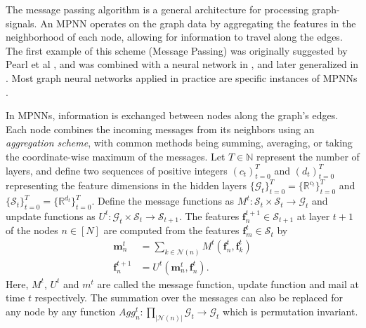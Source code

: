 \documentclass[letterpaper]{article} %
\newcommand{\ron}[1]{{{\textcolor{red}{\textbf{[Ron:} {#1}\textbf{]}}}}}
\begin{document}

The message passing algorithm is a general architecture for processing graph-signals. An MPNN operates on the graph data by aggregating the features in the neighborhood of each node, allowing for information to travel along the edges. The first example of this scheme (Message Passing) was originally suggested by Pearl et al \cite{pearl1982belief},  and was combined with a neural network in \cite{duvenaud2015convolutional}, and later generalized in \cite{gilmer2017neural}. Most graph neural networks applied in practice are specific instances of MPNNs \cite{MPNN,GCN,GAT}. %

In MPNNs, information is exchanged between nodes along the graph's edges. Each node combines the incoming messages from its neighbors using an \emph{aggregation scheme}, with common methods being summing, averaging, or taking the coordinate-wise maximum of the messages.
Let $T \in \mathbb{N}$ represent the number of layers, and define two sequences of positive integers $(c_t)_{t=0}^T$ and $(d_t)_{t=0}^T$ representing the feature dimensions in the hidden layers $\{\mathcal{G}_t\}_{t=0}^T = \{\mathbb{R}^{c_t}\}_{t=0}^T$ and  $\{\mathcal{S}_t\}_{t=0}^T = \{\mathbb{R}^{d_t}\}_{t=0}^T$. Define the message functions as  $M^t : \mathcal{S}_t \times \mathcal{S}_t \rightarrow \mathcal{G}_t$  and unpdate functions as $U^t: \mathcal{G}_t \times \mathcal{S}_t \rightarrow \mathcal{S}_{t+1}$.
The features $\mathbf{f}_n^{t+1} \in \mathcal{S}_{t+1}$ at layer $t+1$ of the nodes $n\in[N]$ are computed from the features $\mathbf{f}_m^t  \in \mathcal{S}_t$ by 
\begin{align*}
    \mathbf{m}^{t}_n &= \underset{k\in \mathcal{N}(n)}{\sum}{M^t(\mathbf{f}^t_n,\mathbf{f}^t_k)}\\
    \mathbf{f}^{t+1}_n &= U^t(\mathbf{m}^t_n, \mathbf{f}^t_n).
\end{align*}
Here, $M^t$, $U^t$ and $m^t$ are called the message function, update function and mail at time $t$ respectively.  The summation over the messages can also be replaced for any node by any function $Agg_n^t: \prod_{|\mathcal{N}(n)|} \mathcal{G}_t \rightarrow \mathcal{G}_t$
which is permutation invariant. 
\end{document}
